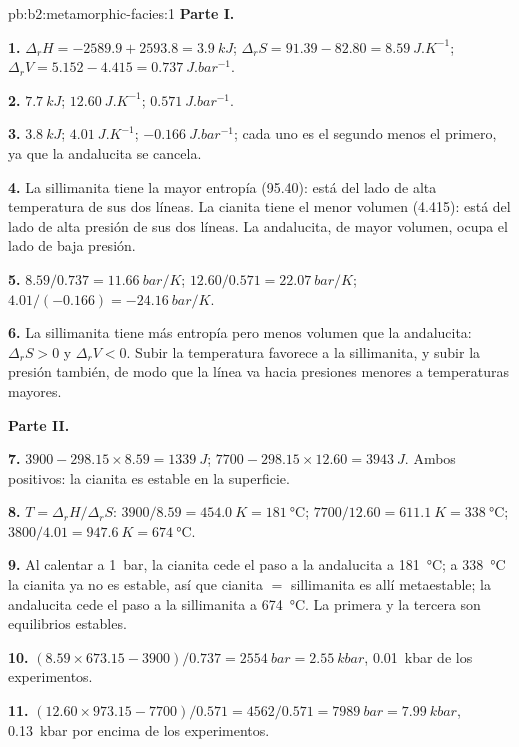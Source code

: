 \begin{solution}{pb:b2:metamorphic-facies:1}
\noindent\textbf{Parte I.}

\textbf{1.} $\Delta_r H = -2589.9 + 2593.8 = \qty{3.9}{kJ}$; $\Delta_r S = 91.39 - 82.80 =
\qty{8.59}{J.K^{-1}}$; $\Delta_r V = 5.152 - 4.415 = \qty{0.737}{J.bar^{-1}}$.

\textbf{2.} $\qty{7.7}{kJ}$; $\qty{12.60}{J.K^{-1}}$; $\qty{0.571}{J.bar^{-1}}$.

\textbf{3.} $\qty{3.8}{kJ}$; $\qty{4.01}{J.K^{-1}}$; $\qty{-0.166}{J.bar^{-1}}$; cada uno es
el segundo menos el primero, ya que la andalucita se cancela.

\textbf{4.} La sillimanita tiene la mayor entropía (95.40): está del lado de alta temperatura
de sus dos líneas. La cianita tiene el menor volumen (4.415): está del lado de
alta presión de sus dos líneas. La andalucita, de mayor volumen, ocupa el
lado de baja presión.

\textbf{5.} $8.59/0.737 = \qty{11.66}{bar/K}$; $12.60/0.571 = \qty{22.07}{bar/K}$;
$4.01/(-0.166) = \qty{-24.16}{bar/K}$.

\textbf{6.} La sillimanita tiene más entropía pero menos volumen que la andalucita: $\Delta_r S > 0$
y $\Delta_r V < 0$. Subir la temperatura favorece a la sillimanita, y subir la presión
también, de modo que la línea va hacia presiones menores a temperaturas mayores.

\noindent\textbf{Parte II.}

\textbf{7.} $3900 - 298.15\times8.59 = \qty{+1339}{J}$; $7700 - 298.15\times12.60 =
\qty{+3943}{J}$. Ambos positivos: la cianita es estable en la superficie.

\textbf{8.} $T = \Delta_r H/\Delta_r S$: $3900/8.59 = \qty{454.0}{K} = \qty{181}{\celsius}$;
$7700/12.60 = \qty{611.1}{K} = \qty{338}{\celsius}$; $3800/4.01 = \qty{947.6}{K} =
\qty{674}{\celsius}$.

\textbf{9.} Al calentar a \qty{1}{bar}, la cianita cede el paso a la andalucita a
\qty{181}{\celsius}; a \qty{338}{\celsius} la cianita ya no es estable, así que cianita $=$
sillimanita es allí metaestable; la andalucita cede el paso a la sillimanita a
\qty{674}{\celsius}. La primera y la tercera son equilibrios estables.

\textbf{10.} $(8.59\times673.15 - 3900)/0.737 = \qty{2554}{bar} = \qty{2.55}{kbar}$,
\qty{0.01}{kbar} de los experimentos.

\textbf{11.} $(12.60\times973.15 - 7700)/0.571 = 4562/0.571 = \qty{7989}{bar} =
\qty{7.99}{kbar}$, \qty{0.13}{kbar} por encima de los experimentos.


\end{solution}
